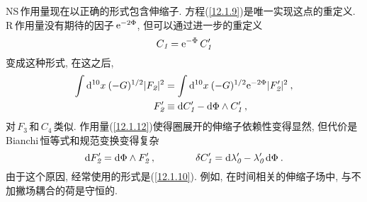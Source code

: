 NS\,作用量现在以正确的形式包含伸缩子. 方程(\ref{12.1.9})是唯一实现这点的重定义. R\,作用量没有期待的因子$\,\mathrm{e}^{-2\Phi}$, 但可以通过进一步的重定义
\begin{equation}
    C_{\textit{1}} =\mathrm{e}^{-\Phi}\,C_{\textit{1}}^{\prime} \label{12.1.11}
\end{equation}
变成这种形式, 在这之后,
\begin{subequations}
    \begin{align}
        \int \mathrm{d}^{10}x\:(-G)^{1/2}\lvert F_{\textit{2}}\rvert^{2} &= \int \mathrm{d}^{10}x\: (-G)^{1/2}\mathrm{e}^{-2\Phi}\lvert F_{\textit{2}}^{\prime}\rvert^{2} \:, \label{12.1.12a} \\
        F_{\textit{2}}^{\prime} &\equiv \mathrm{d} C_{\textit{1}}^{\prime}-\mathrm{d}\Phi\wedge C_{\textit{1}}^{\prime} \:, \label{12.1.12b}
    \end{align} \label{12.1.12}
\end{subequations}
对$\,F_{\textit{3}}\,$和$\,C_{\textit{4}}\,$类似. 作用量(\ref{12.1.12})使得圈展开的伸缩子依赖性变得显然, 但代价是\,Bianchi\,恒等式和规范变换变得复杂
\begin{equation}    
    \mathrm{d} F_{\textit{2}}^{\prime} = \mathrm{d} \Phi\wedge F_{\textit{2}}^{\prime}\:,\qquad\qquad 
    \delta C_{\textit{1}}^{\prime} =\mathrm{d} \lambda_{\textit{0}}^{\prime}- \lambda_{\textit{0}}^{\prime}\,\mathrm{d}\Phi \:. \label{12.1.13}
\end{equation}  
由于这个原因, 经常使用的形式是(\ref{12.1.10}). 例如, 在时间相关的伸缩子场中, 与不加撇场耦合的荷是守恒的.

